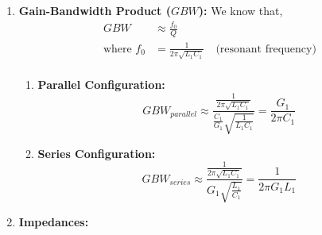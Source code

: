 \begin{enumerate}
\begin{enumerate}
        For band pass \(H_1(s)\):
        \begin{align*}
          H_1(0) &= \frac{G_1}{G_1 + \frac{1}{0 \cdot L_1} + 0 \cdot C_1} = \frac{G_1}{G_1 + \infty} = 0
        \end{align*}
        Zero DC gain for \(H_1(s)\). \\
        For band stop \(H_2(s)\):
        \begin{align*}
          H_2(0) &= \frac{\frac{1}{0 \cdot L_1} + 0 \cdot C_1}{G_1 + \frac{1}{0 \cdot L_1} + 0 \cdot C_1} = \frac{\infty + 0}{G_1 + \infty} = 1
        \end{align*}
        Unity DC gain for \(H_2(s)\).
      \item \textbf{Series Configuration:}\\
        For band pass \(H_3(s)\):
        \begin{align*}
          H_3(0) &= \frac{0 \cdot C_1}{0 \cdot C_1 + G_1(1 + 0^2 \cdot L_1 C_1)} = 0
        \end{align*}
        Zero DC gain for \(H_3(s)\). \\
        For band stop \(H_4(s)\):
        \begin{align*}
          H_4(0) &= \frac{G_1(1 + 0^2 \cdot L_1 C_1)}{0 \cdot C_1 + G_1(1 + 0^2 \cdot L_1 C_1)} = \frac{G_1(1 + 0)}{0 + G_1(1 + 0)} = 1 \\
        \end{align*}
        Unity DC gain for \(H_4(s)\).
    \end{enumerate}
  \item \textbf{Gain-Bandwidth Product (\(GBW\)):}
    We know that,
    \begin{align*}
      GBW &\approx \frac{f_0}{Q} \\
      \text{where } f_0 &= \frac{1}{2\pi \sqrt{L_1 C_1}} \quad \text{(resonant frequency)} \\
    \end{align*}
    \begin{enumerate}
      \item \textbf{Parallel Configuration:}
        \[
          GBW_{parallel} \approx \frac{\frac{1}{2\pi \sqrt{L_1 C_1}}}{\frac{C_1}{G_1} \sqrt{\frac{1}{L_1 C_1}}} = \frac{G_1}{2\pi C_1}
        \]
      \item \textbf{Series Configuration:}
        \[
          GBW_{series} \approx \frac{\frac{1}{2\pi \sqrt{L_1 C_1}}}{G_1 \sqrt{\frac{L_1}{C_1}}} = \frac{1}{2\pi G_1 L_1}
        \]
    \end{enumerate}
  \item \textbf{Impedances:}

\end{enumerate}
